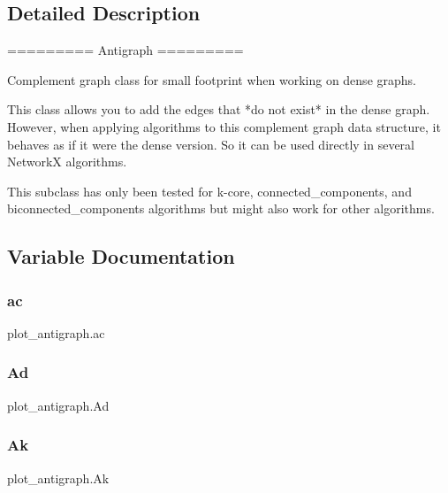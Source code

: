\subsection{Detailed Description}
\begin{DoxyVerb}=========
Antigraph
=========

Complement graph class for small footprint when working on dense graphs.

This class allows you to add the edges that *do not exist* in the dense
graph. However, when applying algorithms to this complement graph data
structure, it behaves as if it were the dense version. So it can be used
directly in several NetworkX algorithms.

This subclass has only been tested for k-core, connected_components,
and biconnected_components algorithms but might also work for other
algorithms.\end{DoxyVerb}
 

\subsection{Variable Documentation}
\mbox{\label{namespaceplot__antigraph_a5fd9c099e35e5ea1fac4e9ebff5f4f1e}} 
\subsubsection{\texorpdfstring{ac}{ac}}
{\footnotesize\ttfamily plot\+\_\+antigraph.\+ac}

\mbox{\label{namespaceplot__antigraph_a3fae53e8a70927189f658f99012c93c5}} 
\subsubsection{\texorpdfstring{Ad}{Ad}}
{\footnotesize\ttfamily plot\+\_\+antigraph.\+Ad}

\mbox{\label{namespaceplot__antigraph_a22f627b032b618bd3a5fab0e42c0fa5b}} 
\subsubsection{\texorpdfstring{Ak}{Ak}}
{\footnotesize\ttfamily plot\+\_\+antigraph.\+Ak}

